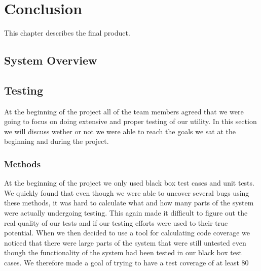 \chapter{Conclusion}
\label{cha:conclusion}
This chapter describes the final product. 

\section{System Overview}


\section{Testing}
At the beginning of the project all of the team members agreed that we were going to focus on doing extensive and proper testing of our utility. In this section we will discuss wether or not we were able to reach the goals we sat at the beginning and during the project.

\subsection{Methods}
At the beginning of the project we only used black box test cases and unit tests. We quickly found that even though we were able to uncover several bugs using these methods, it was hard to calculate what and how many parts of the system were actually undergoing testing. This again made it difficult to figure out the real quality of our tests and if our testing efforts were used to their true potential. When we then decided to use a tool for calculating code coverage we noticed that there were large parts of the system that were still untested even though the functionality of the system had been tested in our black box test cases. We therefore made a goal of trying to have a test coverage of at least 80%

